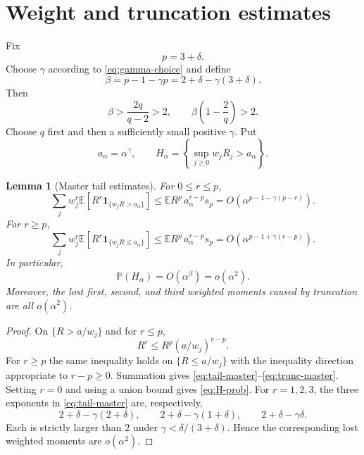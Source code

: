 \documentclass[11pt,a4paper]{article}
\newtheorem{lemma}{Lemma}
\newcommand{\E}{\mathbb E}
\newcommand{\Prob}{\mathbb P}
\begin{document}
\section{Weight and truncation estimates}
Fix
\[
p=3+\delta.
\]
Choose $\gamma$ according to \eqref{eq:gamma-choice} and define
\[
\beta=p-1-\gamma p=2+\delta-\gamma(3+\delta).
\]
Then
\[
\beta>\frac{2q}{q-2}>2,
\qquad
\beta\left(1-\frac2q\right)>2.
\]
Choose $q$ first and then a sufficiently small positive $\gamma$.  Put
\[
a_\alpha=\alpha^\gamma,
\qquad
H_\alpha=\left\{\sup_{j\ge0}w_jR_j>a_\alpha\right\}.
\]

\begin{lemma}[Master tail estimates]
For $0\le r\le p$,
\begin{equation}\label{eq:tail-master}
\sum_j w_j^r\E\!\left[R^r\mathbf 1_{\{w_jR>a_\alpha\}}\right]
\le \E R^p\,a_\alpha^{r-p}s_p
=O\!\left(\alpha^{p-1-\gamma(p-r)}\right).
\end{equation}
For $r\ge p$,
\begin{equation}\label{eq:trunc-master}
\sum_j w_j^r\E\!\left[R^r\mathbf 1_{\{w_jR\le a_\alpha\}}\right]
\le \E R^p\,a_\alpha^{r-p}s_p
=O\!\left(\alpha^{p-1+\gamma(r-p)}\right).
\end{equation}
In particular,
\begin{equation}\label{eq:H-prob}
\Prob(H_\alpha)=O(\alpha^\beta)=o(\alpha^2).
\end{equation}
Moreover, the lost first, second, and third weighted moments caused by truncation are all $o(\alpha^2)$.
\end{lemma}

\begin{proof}
On $\{R>a/w_j\}$ and for $r\le p$,
\[
R^r\le R^p(a/w_j)^{r-p}.
\]
For $r\ge p$ the same inequality holds on $\{R\le a/w_j\}$ with the inequality direction appropriate to $r-p\ge0$.  Summation gives \eqref{eq:tail-master}--\eqref{eq:trunc-master}.  Setting $r=0$ and using a union bound gives \eqref{eq:H-prob}.  For $r=1,2,3$, the three exponents in \eqref{eq:tail-master} are, respectively,
\[
2+\delta-\gamma(2+\delta),\qquad
2+\delta-\gamma(1+\delta),\qquad
2+\delta-\gamma\delta.
\]
Each is strictly larger than $2$ under
$\gamma<\delta/(3+\delta)$.  Hence the corresponding lost weighted moments
are $o(\alpha^2)$.
\end{proof}
\end{document}
